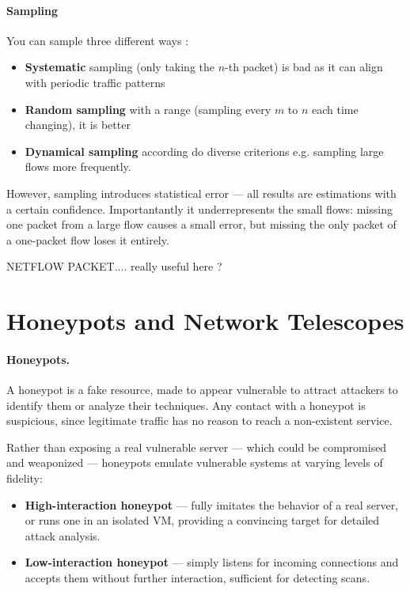 \paragraph{Sampling} You can sample three different ways : 
\begin{itemize}
    \item\textbf{Systematic} sampling (only taking the $n$-th packet) is bad as it can align with periodic traffic patterns
    \item \textbf{Random sampling} with a range (sampling every $m$ to $n$ each time changing), it is better
    \item \textbf{Dynamical sampling} according do diverse criterions e.g. sampling large flows more frequently.
\end{itemize}
However, sampling introduces statistical error — all results are estimations with a certain confidence. Importantantly it underrepresents the small flows: missing one packet from a large flow causes a small error, but missing the only packet of a one-packet flow loses it entirely.


NETFLOW PACKET.... really useful here ?


\section{Honeypots and Network Telescopes}

\paragraph{Honeypots.}
A honeypot is a fake resource, made to appear vulnerable to attract attackers to identify them or analyze their techniques. Any contact with a honeypot is suspicious, since legitimate traffic has no reason to reach a non-existent service.

Rather than exposing a real vulnerable server — which could be compromised and weaponized — honeypots emulate vulnerable systems at varying levels of fidelity:
\begin{itemize}
    \item \textbf{High-interaction honeypot} — fully imitates the behavior of a real server, or runs one in an isolated VM, providing a convincing target for detailed attack analysis.
    \item \textbf{Low-interaction honeypot} — simply listens for incoming connections and accepts them without further interaction, sufficient for detecting scans.
\end{itemize}

